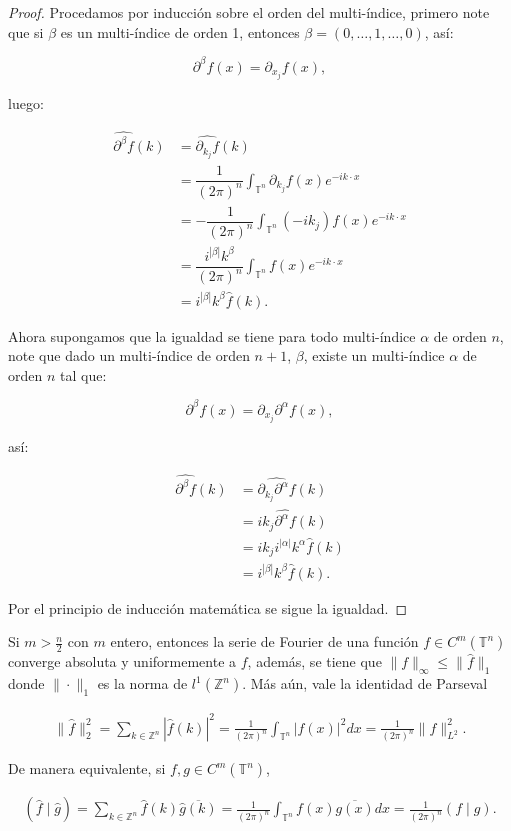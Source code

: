 \documentclass[12pt]{article}
\newcommand\T{\mathbb{T}}
\begin{document}
\begin{proof}
Procedamos  por inducción sobre el orden del multi-índice, primero note que si $\beta$ es un multi-índice de orden 1, entonces $\beta=(0,\ldots,1,\ldots,0)$, así:

$$\partial^{\beta}f(x)=\partial_{x_j}f(x),$$

luego:

\begin{align*}
    \widehat{\partial^{\beta}f}(k)&=\widehat{\partial_{k_j}f}(k)\\
    &=\dfrac{1}{(2\pi)^n}\int_{\T^n}\partial_{k_j}f(x)e^{-ik\cdot x}\\
    &=-\dfrac{1}{(2\pi)^n}\int_{\T^n}(-ik_j)f(x)e^{-ik\cdot x}\\
    &=\dfrac{i^{|\beta|}k^{\beta}}{(2\pi)^n}\int_{\T^n}f(x)e^{-ik\cdot x}\\
    &=i^{|\beta|}k^{\beta}\hat{f}(k)
.\end{align*}

Ahora supongamos que la igualdad se tiene para todo multi-índice $\alpha$ de orden $n$, note que dado un multi-índice de orden $n+1$, $\beta$, existe un multi-índice $\alpha$ de orden $n$ tal que:

$$\partial^{\beta}f(x)=\partial_{x_j}\partial^{\alpha}f(x),$$

así:

\begin{align*}
    \widehat{\partial^{\beta}f}(k)&=\widehat{\partial_{k_j}\partial^{\alpha}f}(k)\\
    &=ik_j\widehat{\partial^{\alpha}f}(k)\\
    &=ik_ji^{|\alpha|}k^{\alpha}\hat{f}(k)\\
    &=i^{|\beta|}k^{\beta}\hat{f}(k)
.\end{align*}

Por el principio de inducción matemática se sigue la igualdad.

\end{proof}


\begin{theorem}
Si $m>\frac{n}{2}$ con $m$ entero, entonces la serie de Fourier de una función $f \in C^m\left(\mathbb{T}^n\right)$ converge absoluta y uniformemente a $f$, además, se tiene que $\|f\|_{\infty} \leq\|\widehat{f}\|_1$ donde $\|\cdot\|_1$ es la norma de $l^1\left(\mathbb{Z}^n\right)$. Más aún, vale la identidad de Parseval

\begin{align}
\|\widehat{f}\|_2^2=\sum_{k \in \mathbb{Z}^n}|\widehat{f}(k)|^2=\frac{1}{(2 \pi)^n} \int_{\T^n}|f(x)|^2 d x=\frac{1}{(2 \pi)^n}\|f\|_{L^2}^2.
\end{align}

De manera equivalente, si $f, g \in C^m\left(\mathbb{T}^n\right)$,

\begin{align}
(\widehat{f} \mid \widehat{g})=\sum_{k \in \mathbb{Z}^n} \widehat{f}(k) \overline{\widehat{g}(k)}=\frac{1}{(2 \pi)^n} \int_{\T^n} f(x) \overline{g(x)} d x=\frac{1}{(2 \pi)^n}(f \mid g).
\end{align}

\end{theorem}
\end{document}
